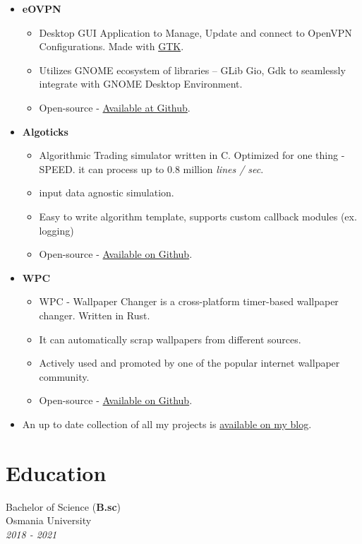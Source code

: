 \documentclass{article}
\begin{document}
\begin{itemize}
    
    \item \textbf{eOVPN}
    \subitem
    \begin{itemize}
        \item Desktop GUI Application to Manage, Update and connect to OpenVPN Configurations. Made with \href{https://gtk.org/}{GTK}.
        \item Utilizes GNOME ecosystem of libraries -- GLib Gio, Gdk to seamlessly integrate with GNOME Desktop Environment.
        \item Open-source - \href{https://github.com/jkotra/eOVPN}{Available at Github}.
    \end{itemize}
    \pagebreak 
    \item \textbf{Algoticks}
    \subitem
    \begin{itemize}
        \item Algorithmic Trading simulator written in C. Optimized for one thing - SPEED. it can process up to 0.8 million \textit{lines / sec}.
        \item input data agnostic simulation.
        \item Easy to write algorithm template, supports custom callback modules (ex. logging)
        \item Open-source - \href{https://github.com/jkotra/algoticks/}{Available on Github}.
    \end{itemize}
    \item \textbf{WPC}
    \subitem
    \begin{itemize}
        \item WPC - Wallpaper Changer is a cross-platform timer-based wallpaper changer. Written in Rust.
        \item It can automatically scrap wallpapers from different sources.
        \item Actively used and promoted by one of the popular internet wallpaper community.
        \item Open-source - \href{https://github.com/jkotra/wpc/}{Available on Github}.
    \end{itemize}
    
    \item An up to date collection of all my projects is \href{https://stdin.top/portfolio/}{available on my blog}.                  
\end{itemize}

\section{Education}
Bachelor of Science (\textbf{B.sc}) \\
Osmania University \\
\emph{2018 - 2021}
\end{document}
